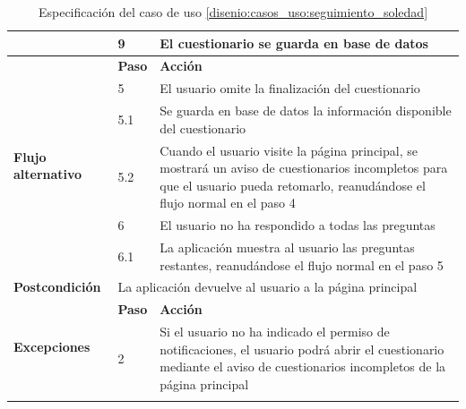 \begin{table}[h]
\begin{tabularx}{\textwidth}{|l|l|X|}
                    \cline{2-3} & 9 & El cuestionario se guarda en base de datos \\
                    \hline
                    \multirow{6}{*}{\textbf{Flujo alternativo}} & \textbf{Paso} & \textbf{Acción} \\
                    \cline{2-3} & 5 & El usuario omite la finalización del cuestionario \\
                    \cline{2-3} & 5.1 & Se guarda en base de datos la información disponible del cuestionario \\
                    \cline{2-3} & 5.2 & Cuando el usuario visite la página principal, se mostrará un aviso de cuestionarios incompletos para que el usuario pueda retomarlo, reanudándose el flujo normal en el paso 4 \\
                    \cline{2-3} & 6 & El usuario no ha respondido a todas las preguntas \\
                    \cline{2-3} & 6.1 & La aplicación muestra al usuario las preguntas restantes, reanudándose el flujo normal en el paso 5 \\
                    \hline
                    \textbf{Postcondición} & \multicolumn{2}{|X|}{La aplicación devuelve al usuario a la página principal} \\
                    \hline
                    \multirow{2}{*}{\textbf{Excepciones}}  & \textbf{Paso} & \textbf{Acción} \\
                    \cline{2-3} & 2 & Si el usuario no ha indicado el permiso de notificaciones, el usuario podrá abrir el cuestionario mediante el aviso de cuestionarios incompletos de la página principal \\
                    \hline
                    \caption{Especificación del caso de uso \ref{disenio:casos_uso:seguimiento_soledad}}
                    \label{tabla:casos_uso:seguimiento_soledad}
                \end{tabularx}
            \end{table}

